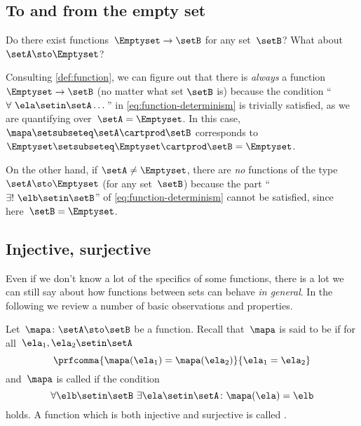 \subsection{To and from the empty set}

Do there exist functions~$\Emptyset \to \setB$ for any set~$\setB$?
What about~$\setA \sto \Emptyset$?

Consulting \cref{def:function}, we can figure out that there is \emph{always} a function $\Emptyset \to \setB$ (no matter what set $\setB$ is) because the condition ``$\forall \ \ela \setin\setA \dots$'' in \cref{eq:function-determinism} is trivially satisfied, as we are quantifying over~$\setA = \Emptyset$.
In this case,~$\mapa \setsubseteq \setA \cartprod \setB$ corresponds to~$\Emptyset \setsubseteq \Emptyset \cartprod \setB = \Emptyset$.

On the other hand, if $\setA \neq \Emptyset$, there are \emph{no} functions of the type~$\setA \sto \Emptyset$ (for any set~$\setB$) because the part ``$\exists ! \ \elb \setin\setB$'' of \cref{eq:function-determinism} cannot be satisfied, since here~$\setB = \Emptyset$.

\subsection{Injective, surjective}

Even if we don't know a lot of the specifics of some functions, there is a lot we can still say about how functions between sets can behave \emph{in general}.
In the following we review a number of basic observations and properties.

Let~$\mapa\colon \setA \sto \setB$ be a function.
Recall that~$\mapa$ is said to be \emph{} if for all~$\ela_1, \ela_2 \setin\setA$
\begin{equation}
    \label{eq:injectivity-cond}
    \prfcomma{
        \mapa(\ela_1) = \mapa(\ela_2)
    }{
        \ela_1 = \ela_2
    }
\end{equation}
and~$\mapa$ is called \emph{} if the condition
\begin{equation}
    \label{eq:surjectivity-cond}
    \forall \elb \setin\setB \ \exists  \ela \setin\setA \colon \mapa(\ela) = \elb
\end{equation}
holds.
A function which is both injective and surjective is called \emph{}.

